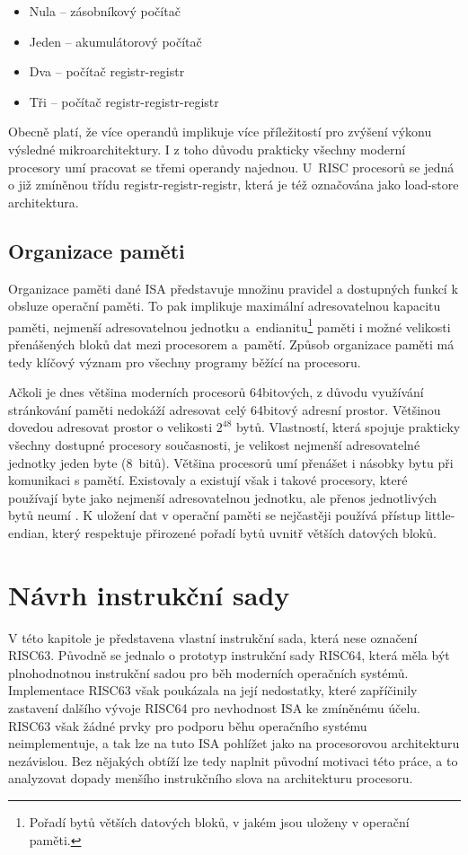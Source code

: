 \documentclass[
  digital, %
  color,   %
  table,   %
  twoside, %
  nolof,   %
  nolot,   %
]{fithesis3}
\begin{document}
\begin{itemize}
  \item Nula -- zásobníkový počítač
  \item Jeden -- akumulátorový počítač
  \item Dva -- počítač registr-registr
  \item Tři -- počítač registr-registr-registr
\end{itemize}

Obecně platí, že více operandů implikuje více příležitostí pro zvýšení výkonu výsledné mikroarchitektury. I z toho důvodu prakticky všechny moderní procesory umí pracovat se třemi operandy najednou. U~RISC procesorů se jedná o již zmíněnou třídu registr-registr-registr, která je též označována jako load-store architektura.

\section{Organizace paměti}
Organizace paměti dané ISA představuje množinu pravidel a dostupných funkcí k obsluze operační paměti. To pak implikuje maximální adresovatelnou kapacitu paměti, nejmenší adresovatelnou jednotku a~endianitu\footnote{Pořadí bytů větších datových bloků, v jakém jsou uloženy v operační paměti.} paměti i možné velikosti přenášených bloků dat mezi procesorem a~pamětí. Způsob organizace paměti má tedy klíčový význam pro všechny programy běžící na procesoru.

Ačkoli je dnes většina moderních procesorů 64bitových, z důvodu využívání stránkování paměti nedokáží adresovat celý 64bitový adresní prostor. Většinou dovedou adresovat prostor o velikosti $2^{48}$ bytů. Vlastností, která spojuje prakticky všechny dostupné procesory současnosti, je velikost nejmenší adresovatelné jednotky jeden byte (8~bitů). Většina procesorů umí přenášet i násobky bytu při komunikaci s pamětí. Existovaly a existují však i takové procesory, které používají byte jako nejmenší adresovatelnou jednotku, ale přenos jednotlivých bytů neumí \parencite{alpha14}. K uložení dat v operační paměti se nejčastěji používá přístup little-endian, který respektuje přirozené pořadí bytů uvnitř větších datových bloků.

\chapter{Návrh instrukční sady}
V této kapitole je představena vlastní instrukční sada, která nese označení RISC63. Původně se jednalo o prototyp instrukční sady RISC64, která měla být plnohodnotnou instrukční sadou pro běh moderních operačních systémů. Implementace RISC63 však poukázala na její nedostatky, které zapříčinily zastavení dalšího vývoje RISC64 pro nevhodnost ISA ke zmíněnému účelu. RISC63 však žádné prvky pro podporu běhu operačního systému neimplementuje, a tak lze na tuto ISA pohlížet jako na procesorovou architekturu nezávislou. Bez nějakých obtíží lze tedy naplnit původní motivaci této práce, a to analyzovat dopady menšího instrukčního slova na architekturu procesoru.
\end{document}
